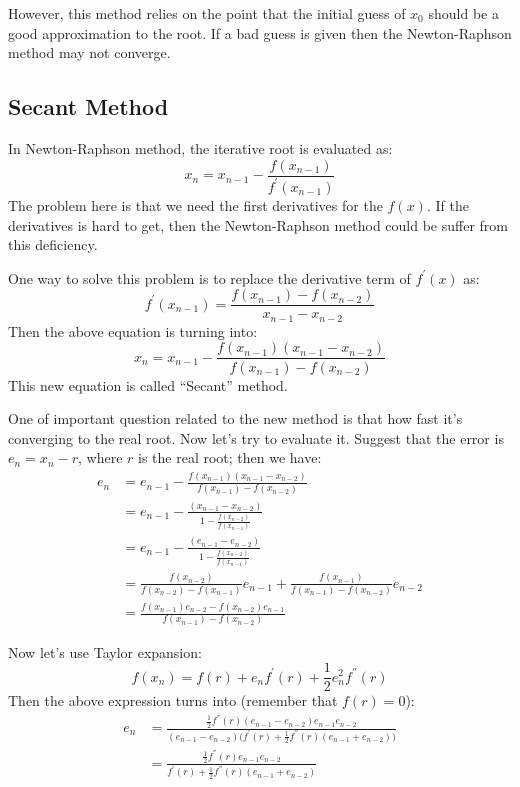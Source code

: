 However, this method relies on the point that the initial guess of $x_{0}$ should be a good 
approximation to the root. If a bad guess is given then the Newton-Raphson method may not 
converge.

\subsection{Secant Method}
%
%
%
In Newton-Raphson method, the iterative root is evaluated as:
\begin{equation}
 x_{n} = x_{n-1} - \frac{f(x_{n-1})}{f^{'}(x_{n-1})}
\end{equation}
The problem here is that we need the first derivatives for the $f(x)$. If the derivatives
is hard to get, then the Newton-Raphson method could be suffer from this deficiency.

One way to solve this problem is to replace the derivative term of $f^{'}(x)$ as:
\begin{equation}
 f^{'}(x_{n-1}) = \frac{f(x_{n-1}) - f(x_{n-2})}{x_{n-1} - x_{n-2}}
\end{equation}
Then the above equation is turning into:
\begin{equation}
\label{secant_eq:1}
 x_{n} = x_{n-1} - \frac{f(x_{n-1})(x_{n-1} - x_{n-2})}{f(x_{n-1}) - f(x_{n-2})}
\end{equation}
This new equation is called ``Secant'' method.

One of important question related to the new method is that how fast it's converging to
the real root. Now let's try to evaluate it. Suggest that the error is $e_{n} = x_{n} -r$,
where $r$ is the real root; then we have:
\begin{align}
\label{secant_eq:2}
 e_{n} &= e_{n-1} - \frac{f(x_{n-1})(x_{n-1} - x_{n-2})}{f(x_{n-1}) - f(x_{n-2})}  \nonumber \\
       &= e_{n-1} - \frac{(x_{n-1} - x_{n-2})}{1 - \frac{f(x_{n-2})}{f(x_{n-1})}} \nonumber \\
       &= e_{n-1} - \frac{(e_{n-1} - e_{n-2})}{1 - \frac{f(x_{n-2})}{f(x_{n-1})}} \nonumber \\
       &= \frac{f(x_{n-2})}{f(x_{n-2})-f(x_{n-1})}e_{n-1} + 
\frac{f(x_{n-1})}{f(x_{n-1})-f(x_{n-2})}e_{n-2} \nonumber \\
       &= \frac{f(x_{n-1})e_{n-2} - f(x_{n-2})e_{n-1}}{f(x_{n-1})-f(x_{n-2})} 
\end{align}

Now let's use Taylor expansion:
\begin{equation}
 f(x_{n}) = f(r) + e_{n}f^{'}(r) + \frac{1}{2}e^{2}_{n}f^{''}(r)
\end{equation}
Then the above expression turns into (remember that $f(r) = 0$):
\begin{align}
\label{secant_eq:3}
 e_{n} &= \frac{\frac{1}{2}f^{''}(r)(e_{n-1}-e_{n-2})e_{n-1}e_{n-2}}{(e_{n-1}-e_{n-2})
\Big ( f^{'}(r) +\frac{1}{2}f^{''}(r)(e_{n-1}+e_{n-2}) \Big ) } \nonumber \\
&= \frac{\frac{1}{2}f^{''}(r)e_{n-1}e_{n-2}}{f^{'}(r) +\frac{1}{2}f^{''}(r)(e_{n-1}+e_{n-2})}
\end{align}

